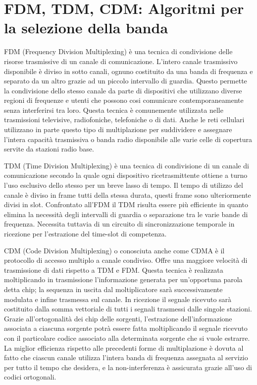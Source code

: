 \section{FDM, TDM, CDM: Algoritmi per la selezione della banda}

FDM (Frequency Division Multiplexing) è una tecnica di condivisione delle risorse trasmissive di un canale di comunicazione. L’intero canale trasmissivo disponibile è diviso in sotto canali, ognuno costituito da una banda di frequenza e separato da un altro grazie ad un piccolo intervallo di guardia.
Questo permette la condivisione dello stesso canale da parte di dispositivi che utilizzano diverse regioni di frequenze e utenti che possono cosi comunicare contemporaneamente senza interferirsi tra loro.
Questa tecnica è comunemente utilizzata nelle trasmissioni televisive, radiofoniche, telefoniche o di dati. Anche le reti cellulari utilizzano in parte questo tipo di multiplazione per suddividere e assegnare l’intera capacità trasmissiva o banda radio disponibile alle varie celle di copertura servite da stazioni radio base.
 
TDM (Time Division Multiplexing) è una tecnica di condivisione di un canale di comunicazione secondo la quale ogni dispositivo ricetrasmittente ottiene a turno l’uso esclusivo dello stesso per un breve lasso di tempo. Il tempo di utilizzo del canale è diviso in frame tutti della stessa durata, questi frame sono ulteriormente divisi in slot.
Confrontato all’FDM il TDM risulta essere più efficiente in quanto elimina la necessità degli intervalli di guardia o separazione tra le varie bande di frequenza. Necessita tuttavia di un circuito di sincronizzazione temporale in ricezione per l’estrazione del time-slot di competenza.
 

CDM (Code Division Multiplexing) o conosciuta anche come CDMA è il protocollo di accesso multiplo a canale condiviso. Offre una maggiore velocità di trasmissione di dati rispetto a TDM e FDM.
Questa tecnica è realizzata moltiplicando in trasmissione l’informazione generata per un’opportuna parola detta chip; la sequenza in uscita dal moltiplicatore sarà successivamente modulata e infine trasmessa sul canale.
In ricezione il segnale ricevuto sarà costituito dalla somma vettoriale di tutti i segnali trasmessi dalle singole stazioni. Grazie all’ortogonalità dei chip delle sorgenti, l’estrazione dell’informazione associata a ciascuna sorgente potrà essere fatta moltiplicando il segnale ricevuto con il particolare codice associato alla determinata sorgente che si vuole estrarre.
La miglior efficienza rispetto alle precedenti forme di multiplazione è dovuta al fatto che ciascun canale utilizza l’intera banda di frequenza assegnata al servizio per tutto il tempo che desidera, e la non-interferenza è assicurata grazie all’uso di codici ortogonali.

